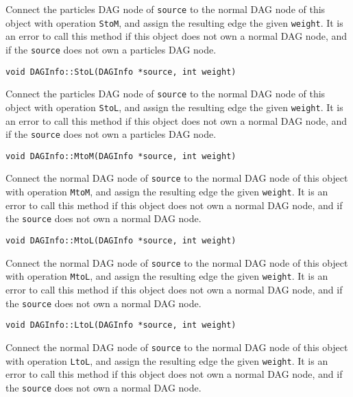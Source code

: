 \noindent Connect the particles DAG node of \texttt{source} to the normal DAG
node of this object with operation \texttt{StoM}, and assign the resulting
edge the given \texttt{weight}. It is an error to call this method if this
object does not own a normal DAG node, and if the \texttt{source} does not
own a particles DAG node.

\begin{lstlisting}
void DAGInfo::StoL(DAGInfo *source, int weight)
\end{lstlisting}

\noindent Connect the particles DAG node of \texttt{source} to the normal DAG
node of this object with operation \texttt{StoL}, and assign the resulting
edge the given \texttt{weight}. It is an error to call this method if this
object does not own a normal DAG node, and if the \texttt{source} does not
own a particles DAG node.

\begin{lstlisting}
void DAGInfo::MtoM(DAGInfo *source, int weight)
\end{lstlisting}

\noindent Connect the normal DAG node of \texttt{source} to the normal DAG
node of this object with operation \texttt{MtoM}, and assign the resulting
edge the given \texttt{weight}. It is an error to call this method if this
object does not own a normal DAG node, and if the \texttt{source} does not
own a normal DAG node.

\begin{lstlisting}
void DAGInfo::MtoL(DAGInfo *source, int weight)
\end{lstlisting}

\noindent Connect the normal DAG node of \texttt{source} to the normal DAG
node of this object with operation \texttt{MtoL}, and assign the resulting
edge the given \texttt{weight}. It is an error to call this method if this
object does not own a normal DAG node, and if the \texttt{source} does not
own a normal DAG node.

\begin{lstlisting}
void DAGInfo::LtoL(DAGInfo *source, int weight)
\end{lstlisting}

\noindent Connect the normal DAG node of \texttt{source} to the normal DAG
node of this object with operation \texttt{LtoL}, and assign the resulting
edge the given \texttt{weight}. It is an error to call this method if this
object does not own a normal DAG node, and if the \texttt{source} does not
own a normal DAG node.


